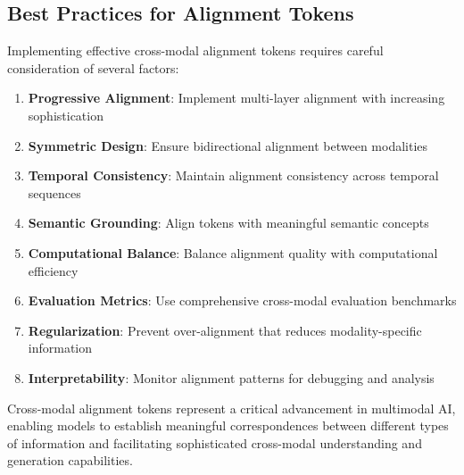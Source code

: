 \subsection{Best Practices for Alignment Tokens}

Implementing effective cross-modal alignment tokens requires careful consideration of several factors:

\begin{enumerate}
\item \textbf{Progressive Alignment}: Implement multi-layer alignment with increasing sophistication
\item \textbf{Symmetric Design}: Ensure bidirectional alignment between modalities
\item \textbf{Temporal Consistency}: Maintain alignment consistency across temporal sequences
\item \textbf{Semantic Grounding}: Align tokens with meaningful semantic concepts
\item \textbf{Computational Balance}: Balance alignment quality with computational efficiency
\item \textbf{Evaluation Metrics}: Use comprehensive cross-modal evaluation benchmarks
\item \textbf{Regularization}: Prevent over-alignment that reduces modality-specific information
\item \textbf{Interpretability}: Monitor alignment patterns for debugging and analysis
\end{enumerate}

Cross-modal alignment tokens represent a critical advancement in multimodal AI, enabling models to establish meaningful correspondences between different types of information and facilitating sophisticated cross-modal understanding and generation capabilities.
